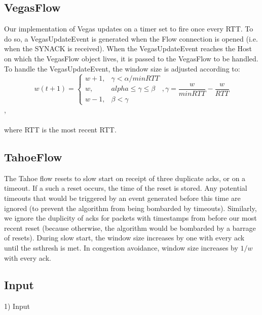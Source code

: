 \documentclass[12pt]{article}
\begin{document}
\subsection{VegasFlow}
Our implementation of Vegas updates on a timer set to fire once every RTT.  To do so, a VegasUpdateEvent is generated when the Flow connection is opened (i.e. when the SYNACK is received).  When the VegasUpdateEvent reaches the Host on which the VegasFlow object lives, it is passed to the VegasFlow to be handled.  To handle the VegasUpdateEvent, the window size is adjusted according to:
$$ w(t + 1) = \begin{cases} w + 1, & \gamma < \alpha / minRTT \\ w, & alpha \le \gamma \le \beta \\ w - 1, & \beta < \gamma \end{cases}, \gamma = \dfrac{w}{minRTT} - \dfrac{w}{RTT} $$,
\\\\
where RTT is the most recent RTT.

\subsection{TahoeFlow}
The Tahoe flow resets to slow start on receipt of three duplicate acks, or on a timeout.  If a such a reset occurs, the time of the reset is stored.  Any potential timeouts that would be triggered by an event generated before this time are ignored (to prevent the algorithm from being bombarded by timeouts).  Similarly, we ignore the duplicity of acks for packets with timestamps from before our most recent reset (because otherwise, the algorithm would be bombarded by a barrage of resets).  During slow start, the window size increases by one with every ack until the ssthresh is met.  In congestion avoidance, window size increases by $1/w$ with every ack.

\subsection{Input}
1) Input
\end{document}
